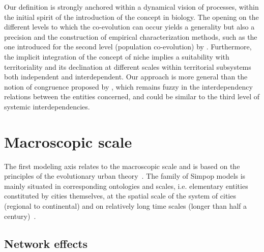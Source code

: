 \documentclass[11pt]{article}
\begin{document}
Our definition is strongly anchored within a dynamical vision of processes, within the initial spirit of the introduction of the concept in biology. The opening on the different levels to which the co-evolution can occur yields a generality but also a precision and the construction of empirical characterization methods, such as the one introduced for the second level (population co-evolution) by \cite{raimbault2017identification}. Furthermore, the implicit integration of the concept of niche implies a suitability with territoriality and its declination at different scales within territorial subsystems both independent and interdependent. Our approach is more general than the notion of congruence proposed by \cite{offner1993effets}, which remains fuzzy in the interdependency relations between the entities concerned, and could be similar to the third level of systemic interdependencies.







\section{Macroscopic scale}


The first modeling axis relates to the macroscopic scale and is based on the principles of the evolutionary urban theory~\citep{pumain1997pour}. The family of Simpop models is mainly situated in corresponding ontologies and scales, i.e. elementary entities constituted by cities themselves, at the spatial scale of the system of cities (regional to continental) and on relatively long time scales (longer than half a century)~\citep{pumain2012multi}.


\subsection{Network effects}
\end{document}
